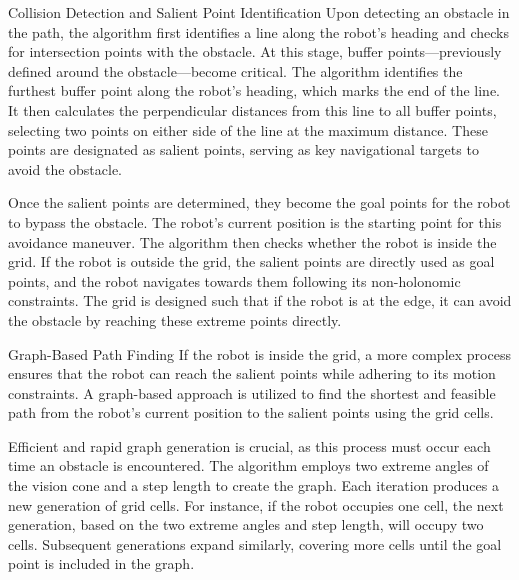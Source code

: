 \vspace*{6mm}  

Collision Detection and Salient Point Identification
Upon detecting an obstacle in the path, the algorithm first identifies a line along the robot’s heading and checks for intersection points with the obstacle. At this stage, buffer points—previously defined around the obstacle—become critical. The algorithm identifies the furthest buffer point along the robot's heading, which marks the end of the line. It then calculates the perpendicular distances from this line to all buffer points, selecting two points on either side of the line at the maximum distance. These points are designated as salient points, serving as key navigational targets to avoid the obstacle.

\vspace*{6mm}  

Once the salient points are determined, they become the goal points for the robot to bypass the obstacle. The robot's current position is the starting point for this avoidance maneuver. The algorithm then checks whether the robot is inside the grid. If the robot is outside the grid, the salient points are directly used as goal points, and the robot navigates towards them following its non-holonomic constraints. The grid is designed such that if the robot is at the edge, it can avoid the obstacle by reaching these extreme points directly.

\vspace*{6mm}  

Graph-Based Path Finding
If the robot is inside the grid, a more complex process ensures that the robot can reach the salient points while adhering to its motion constraints. A graph-based approach is utilized to find the shortest and feasible path from the robot's current position to the salient points using the grid cells.

\vspace*{6mm}  

Efficient and rapid graph generation is crucial, as this process must occur each time an obstacle is encountered. The algorithm employs two extreme angles of the vision cone and a step length to create the graph. Each iteration produces a new generation of grid cells. For instance, if the robot occupies one cell, the next generation, based on the two extreme angles and step length, will occupy two cells. Subsequent generations expand similarly, covering more cells until the goal point is included in the graph.

